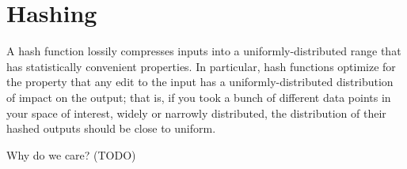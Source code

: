 \section{Hashing}
A hash function lossily compresses inputs into a uniformly-distributed range
that has statistically convenient properties. In particular, hash functions
optimize for the property that any edit to the input has a uniformly-distributed
distribution of impact on the output; that is, if you took a bunch of different
data points in your space of interest, widely or narrowly distributed, the
distribution of their hashed outputs should be close to uniform.

Why do we care? (TODO)
